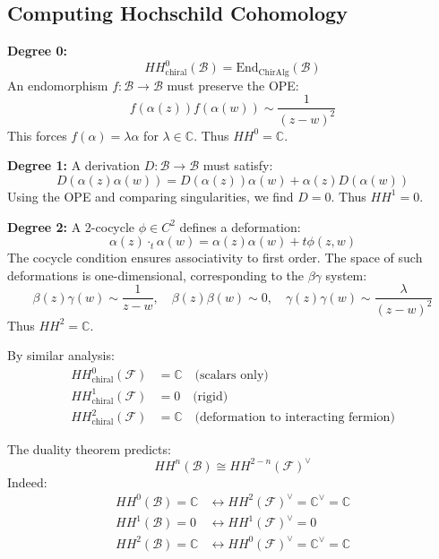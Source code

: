 \subsection{Computing Hochschild Cohomology}

\begin{computation}

\textbf{Degree 0:}
\[
HH^0_{\text{chiral}}(\mathcal{B}) = \text{End}_{\text{ChirAlg}}(\mathcal{B})
\]
An endomorphism $f: \mathcal{B} \to \mathcal{B}$ must preserve the OPE:
\[
f(\alpha(z))f(\alpha(w)) \sim \frac{1}{(z-w)^2}
\]
This forces $f(\alpha) = \lambda \alpha$ for $\lambda \in \mathbb{C}$. Thus $HH^0 = \mathbb{C}$.

\textbf{Degree 1:}
A derivation $D: \mathcal{B} \to \mathcal{B}$ must satisfy:
\[
D(\alpha(z)\alpha(w)) = D(\alpha(z))\alpha(w) + \alpha(z)D(\alpha(w))
\]
Using the OPE and comparing singularities, we find $D = 0$. Thus $HH^1 = 0$.

\textbf{Degree 2:}
A 2-cocycle $\phi \in C^2$ defines a deformation:
\[
\alpha(z) \cdot_t \alpha(w) = \alpha(z)\alpha(w) + t\phi(z,w)
\]
The cocycle condition ensures associativity to first order. The space of such deformations is one-dimensional, corresponding to the $\beta\gamma$ system:
\[
\beta(z)\gamma(w) \sim \frac{1}{z-w}, \quad \beta(z)\beta(w) \sim 0, \quad \gamma(z)\gamma(w) \sim \frac{\lambda}{(z-w)^2}
\]
Thus $HH^2 = \mathbb{C}$.
\end{computation}

\begin{computation}

By similar analysis:
\begin{align}
HH^0_{\text{chiral}}(\mathcal{F}) &= \mathbb{C} \quad \text{(scalars only)} \\
HH^1_{\text{chiral}}(\mathcal{F}) &= 0 \quad \text{(rigid)} \\
HH^2_{\text{chiral}}(\mathcal{F}) &= \mathbb{C} \quad \text{(deformation to interacting fermion)}
\end{align}
\end{computation}

\begin{verification}
The duality theorem predicts:
\[
HH^n(\mathcal{B}) \cong HH^{2-n}(\mathcal{F})^{\vee}
\]
Indeed:
\begin{align}
HH^0(\mathcal{B}) = \mathbb{C} &\leftrightarrow HH^2(\mathcal{F})^{\vee} = \mathbb{C}^{\vee} = \mathbb{C} \\
HH^1(\mathcal{B}) = 0 &\leftrightarrow HH^1(\mathcal{F})^{\vee} = 0 \\
HH^2(\mathcal{B}) = \mathbb{C} &\leftrightarrow HH^0(\mathcal{F})^{\vee} = \mathbb{C}^{\vee} = \mathbb{C}
\end{align}
\end{verification}

